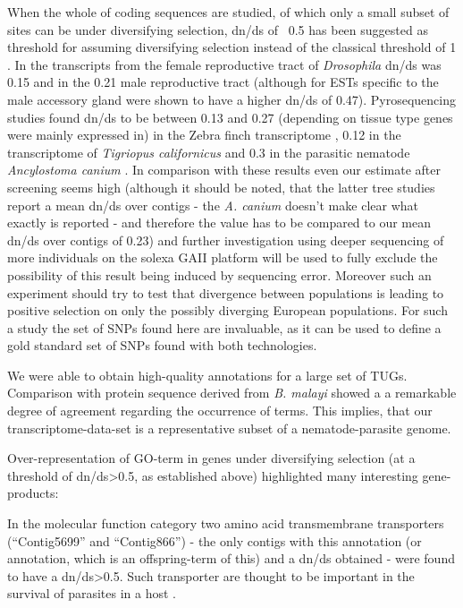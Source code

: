 \documentclass[10pt]{bmc_article}
\newenvironment{bmcformat}{\begin{raggedright}\baselineskip20pt\sloppy\setboolean{publ}{false}}{\end{raggedright}\baselineskip20pt\sloppy}
\begin{document}
\begin{bmcformat}
When the whole of coding sequences are studied, of which only a small
subset of sites can be under diversifying selection, dn/ds of ~0.5 has
been suggested as threshold for assuming diversifying selection
\cite{pmid15579698} instead of the classical threshold of 1
\cite{pmid6449605}. In the transcripts from the female reproductive
tract of \textit{Drosophila} dn/ds was 0.15 \cite{pmid15579698} and in
the 0.21 male reproductive tract \cite{pmid11404480} (although for ESTs
specific to the male accessory gland were shown to have a higher dn/ds
of 0.47). Pyrosequencing studies found dn/ds to be between 0.13 and
0.27 (depending on tissue type genes were mainly expressed in) in the
Zebra finch transcriptome \cite{pmid20359325}, 0.12 in the
transcriptome of \textit{Tigriopus californicus} \cite{pmid21199025}
and 0.3 in the parasitic nematode \textit{Ancylostoma canium}
\cite{pmid20470405}. In comparison with these results even our
estimate after screening seems high (although it should be noted, that
the latter tree studies report a mean dn/ds over contigs - the
\textit{A. canium} doesn't make clear what exactly is reported - and
therefore the value has to be compared to our mean dn/ds over contigs
of 0.23) and further
investigation using deeper sequencing of more individuals on the
solexa GAII platform will be used to fully exclude the possibility of
this result being induced by sequencing error. Moreover such an
experiment should try to test that divergence between populations is
leading to positive selection on only the possibly diverging European
populations. For such a study the set of SNPs found here are
invaluable, as it can be used to define a gold standard set of SNPs
found with both technologies.

We were able to obtain high-quality annotations for a large set of
TUGs. Comparison with protein sequence derived from \textit{B. malayi}
showed a a remarkable degree of agreement regarding the occurrence of
terms. This implies, that our transcriptome-data-set is a
representative subset of a nematode-parasite
genome. 

Over-representation of GO-term in genes under diversifying selection
(at a threshold of dn/ds>0.5, as established above) highlighted many
interesting gene-products:

In the molecular function category two amino acid transmembrane
transporters (``Contig5699'' and ``Contig866'') - the only contigs
with this annotation (or annotation, which is an offspring-term of
this) and a dn/ds obtained - were found to have a dn/ds>0.5. Such
transporter are thought to be important in the survival of parasites in
a host \cite{pmid18272295}.


\end{bmcformat}
\end{document}
